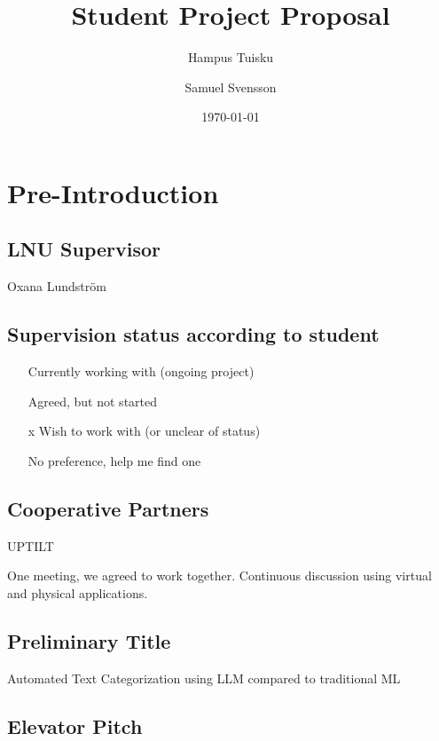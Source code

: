 \documentclass{article}
\title{Student Project Proposal}
\author{Hampus Tuisku \and Samuel Svensson}
\date{\today}
\begin{document}
\maketitle

\section{Pre-Introduction}

\subsection{LNU Supervisor}
Oxana Lundström

\subsection{Supervision status according to student}

\begin{itemize}
      \item [ ] Currently working with (ongoing project)
      \item [ ] Agreed, but not started
      \item [x] Wish to work with (or unclear of status)
      \item [ ] No preference, help me find one
\end{itemize}

\subsection{Cooperative Partners}

UPTILT

One meeting, we agreed to work together.
Continuous discussion using virtual and physical applications.

\subsection{Preliminary Title}


Automated Text Categorization using LLM compared to traditional ML

\subsection{Elevator Pitch}

\end{document}
